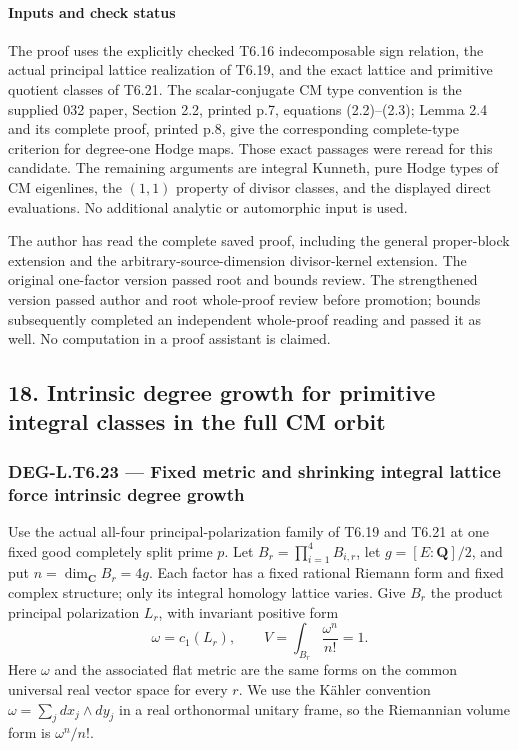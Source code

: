 \documentclass[11pt,a4paper]{article}
\theoremstyle{definition}
\begin{document}
\paragraph{Inputs and check status}\label{inputs-and-check-status}

The proof uses the explicitly checked T6.16 indecomposable sign relation, the actual principal lattice realization of T6.19, and the exact lattice and primitive quotient classes of T6.21. The scalar-conjugate CM type convention is the supplied 032 paper, Section 2.2, printed p.7, equations (2.2)--(2.3); Lemma 2.4 and its complete proof, printed p.8, give the corresponding complete-type criterion for degree-one Hodge maps. Those exact passages were reread for this candidate. The remaining arguments are integral Kunneth, pure Hodge types of CM eigenlines, the \((1,1)\) property of divisor classes, and the displayed direct evaluations. No additional analytic or automorphic input is used.

The author has read the complete saved proof, including the general proper-block extension and the arbitrary-source-dimension divisor-kernel extension. The original one-factor version passed root and bounds review. The strengthened version passed author and root whole-proof review before promotion; bounds subsequently completed an independent whole-proof reading and passed it as well. No computation in a proof assistant is claimed.

\subsection{18. Intrinsic degree growth for primitive integral classes in the full CM orbit}\label{intrinsic-degree-growth-for-primitive-integral-classes-in-the-full-cm-orbit}

\subsubsection{DEG-L.T6.23 --- Fixed metric and shrinking integral lattice force intrinsic degree growth}\label{DEG-L.T6.23}

Use the actual all-four principal-polarization family of T6.19 and T6.21 at one fixed good completely split prime \(p\). Let \(B_r=\prod_{i=1}^4B_{i,r}\), let \(g=[E:\mathbf Q]/2\), and put \(n=\dim_{\mathbf C}B_r=4g\). Each factor has a fixed rational Riemann form and fixed complex structure; only its integral homology lattice varies. Give \(B_r\) the product principal polarization \(L_r\), with invariant positive form \[
 \omega=c_1(L_r),\qquad
 V=\int_{B_r}\frac{\omega^n}{n!}=1.
 \tag{T23.1}
\] Here \(\omega\) and the associated flat metric are the same forms on the common universal real vector space for every \(r\). We use the Kähler convention \(\omega=\sum_j dx_j\wedge dy_j\) in a real orthonormal unitary frame, so the Riemannian volume form is \(\omega^n/n!\).
\end{document}
